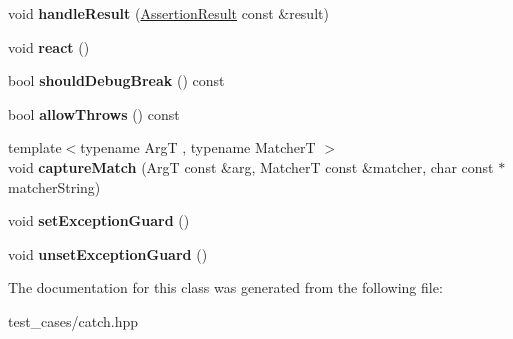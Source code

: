 \begin{DoxyCompactItemize}
\item 
\mbox{\label{classCatch_1_1ResultBuilder_ad8bb17e4ac590b75bf8630d8f3502f4e}} 
void {\bfseries handle\+Result} (\hyperlink{classCatch_1_1AssertionResult}{Assertion\+Result} const \&result)
\item 
\mbox{\label{classCatch_1_1ResultBuilder_a3085cdc46533d45bed6f652a2ac295c0}} 
void {\bfseries react} ()
\item 
\mbox{\label{classCatch_1_1ResultBuilder_a6f2b0dbcc6cc5e0a500ac45f2534e3e7}} 
bool {\bfseries should\+Debug\+Break} () const
\item 
\mbox{\label{classCatch_1_1ResultBuilder_a0428fd78ab9e8e6f1aca6855f20fc715}} 
bool {\bfseries allow\+Throws} () const
\item 
\mbox{\label{classCatch_1_1ResultBuilder_a27425538bec8fee7ac69403c5df6078c}} 
{\footnotesize template$<$typename ArgT , typename MatcherT $>$ }\\void {\bfseries capture\+Match} (ArgT const \&arg, MatcherT const \&matcher, char const $\ast$matcher\+String)
\item 
\mbox{\label{classCatch_1_1ResultBuilder_a87929808b4ec9b6cb5838edc1f27df17}} 
void {\bfseries set\+Exception\+Guard} ()
\item 
\mbox{\label{classCatch_1_1ResultBuilder_a0990e93c1e13f96ffe02fa0f45e8f155}} 
void {\bfseries unset\+Exception\+Guard} ()
\end{DoxyCompactItemize}


The documentation for this class was generated from the following file\+:\begin{DoxyCompactItemize}
\item 
test\+\_\+cases/catch.\+hpp\end{DoxyCompactItemize}
